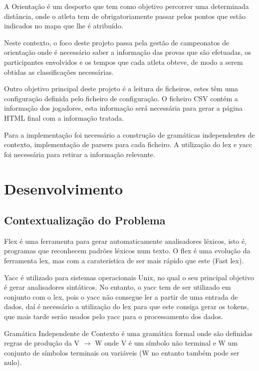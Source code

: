 \documentclass[11pt, a4paper, oneside]{article}
\begin{document}
A Orientação é um desporto que tem como objetivo percorrer uma determinada distância, onde o atleta tem de obrigatoriamente passar pelos pontos que estão indicados no mapa que lhe é atribuído.

Neste contexto, o foco deste projeto passa pela gestão de campeonatos de orientação onde é necessário saber a informação das provas que são efetuadas, os participantes envolvidos e os tempos que cada atleta obteve, de modo a serem obtidas as classificações necessárias.

Outro objetivo principal deste projeto é a leitura de ficheiros, estes têm uma configuração definida pelo ficheiro de configuração. O ficheiro CSV contém a informação dos jogadores, esta informação será necessária para gerar a página HTML final com a informação tratada.

Para a implementação foi necessário a construção de gramáticas independentes de contexto, implementação de parsers para cada ficheiro. A utilização do \textsf{lex} e \textsf{yacc} foi necessária para retirar a informação relevante.


\newpage
\section{Desenvolvimento}

\subsection{Contextualização do Problema}

\textsf{Flex} é uma ferramenta para gerar automaticamente analisadores léxicos, isto é, programas que reconhecem padrões léxicos num texto. O \textsf{flex} é uma evolução da ferramenta \textsf{lex}, mas com a caraterística de ser mais rápido que este (\textsf{Fast lex}).

\textsf{Yacc} é utilizado para sistemas operacionais \textsf{Unix}, no qual o seu principal objetivo é gerar analisadores sintáticos. No entanto, o \textsf{yacc} tem de ser utilizado em conjunto com o \textsf{lex}, pois o \textsf{yacc} não consegue ler a partir de uma entrada de dados, daí é necessário a utilização do \textsf{lex} para que este consiga gerar os tokens, que mais tarde serão usados pelo \textsf{yacc} para o processamento dos dados.

Gramática Independente de Contexto é uma gramática formal onde são definidas regras de produção da V $\rightarrow$ W onde V é um símbolo não terminal e W um conjunto de símbolos terminais ou variáveis (W no entanto também pode ser nulo).
\end{document}
